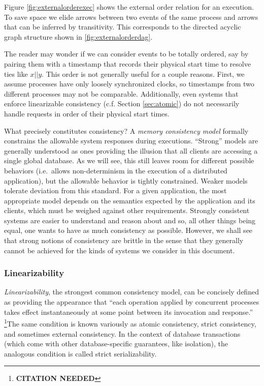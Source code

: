 \documentclass[]             %
{NASA}                       %
\theoremstyle{definition}
\newcommand{\citationneeded}{\footnote{\textbf{CITATION NEEDED}}}
\begin{document}
Figure \ref{fig:externalorderexec} shows the external order relation
for an execution. To save space we elide arrows between two events of
the same process and arrows that can be inferred by transitivity. This
corresponds to the directed acyclic graph structure shown in
\ref{fig:externalorderdag}.

The reader may wonder if we can consider events to be totally ordered,
say by pairing them with a timestamp that records their physical start
time to resolve ties like \(x || y\). This order is not generally useful
for a couple reasons. First, we assume processes have only loosely
synchronized clocks, so timestamps from two different processes may not
be comparable. Additionally, even systems that enforce linearizable
consistency (c.f. Section \ref{sec:atomic}) do not necessarily handle
requests in order of their physical start times.

What precisely constitutes consistency? A \emph{memory consistency
model} formally constrains the allowable system responses during
executions. ``Strong'' models are generally understood as ones
providing the illusion that all clients are accessing a single global
database. As we will see, this still leaves room for different
possible behaviors (i.e.~allows non-determinism in the execution of a
distributed application), but the allowable behavior is tightly
constrained.  Weaker models tolerate deviation from this standard. For
a given application, the most appropriate model depends on the
semantics expected by the application and its clients, which must be
weighed against other requirements. Strongly consistent systems are
easier to understand and reason about and so, all other things being
equal, one wants to have as much consistency as possible. However, we
shall see that strong notions of consistency are brittle in the sense
that they generally cannot be achieved for the kinds of systems we
consider in this document.

\subsubsection{Linearizability}
\label{sssec:linearizability}

\emph{Linearizability}, the strongest common consistency model, can be
concisely defined as providing the appearance that ``each operation
applied by concurrent processes takes effect instantaneously at some
point between its invocation and response.'' \citationneeded The same
condition is known variously as atomic consistency, strict
consistency, and sometimes external consistency. In the context of
database transactions (which come with other database-specific
guarantees, like isolation), the analogous condition is called strict
serializability.
\end{document}
